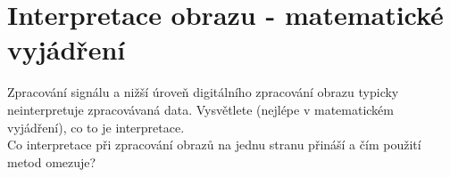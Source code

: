 \section{Interpretace obrazu - matematické vyjádření}
Zpracování signálu a nižší úroveň digitálního zpracování obrazu typicky neinterpretuje zpracovávaná data. Vysvětlete 
(nejlépe v matematickém vyjádření), co to je interpretace. \\ Co interpretace při zpracování obrazů na jednu stranu 
přináší a čím použití metod omezuje?

